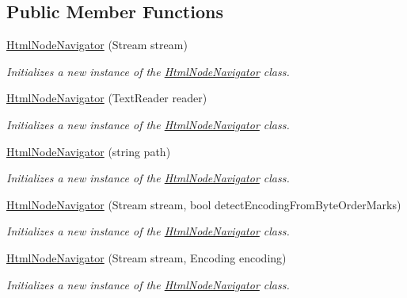 \subsection*{Public Member Functions}
\begin{DoxyCompactItemize}
\item 
\hyperlink{class_html_agility_pack_1_1_html_node_navigator_aecbd88a04f3d05a10f6a489098973ab6}{Html\+Node\+Navigator} (Stream stream)
\begin{DoxyCompactList}\small\item\em Initializes a new instance of the \hyperlink{class_html_agility_pack_1_1_html_node_navigator}{Html\+Node\+Navigator} class. \end{DoxyCompactList}\item 
\hyperlink{class_html_agility_pack_1_1_html_node_navigator_ac81f609b7631365884c346ee186457cd}{Html\+Node\+Navigator} (Text\+Reader reader)
\begin{DoxyCompactList}\small\item\em Initializes a new instance of the \hyperlink{class_html_agility_pack_1_1_html_node_navigator}{Html\+Node\+Navigator} class. \end{DoxyCompactList}\item 
\hyperlink{class_html_agility_pack_1_1_html_node_navigator_add1218ba51639a54431ede39675372cb}{Html\+Node\+Navigator} (string path)
\begin{DoxyCompactList}\small\item\em Initializes a new instance of the \hyperlink{class_html_agility_pack_1_1_html_node_navigator}{Html\+Node\+Navigator} class. \end{DoxyCompactList}\item 
\hyperlink{class_html_agility_pack_1_1_html_node_navigator_a7c91f826d5207f21a16645d029672127}{Html\+Node\+Navigator} (Stream stream, bool detect\+Encoding\+From\+Byte\+Order\+Marks)
\begin{DoxyCompactList}\small\item\em Initializes a new instance of the \hyperlink{class_html_agility_pack_1_1_html_node_navigator}{Html\+Node\+Navigator} class. \end{DoxyCompactList}\item 
\hyperlink{class_html_agility_pack_1_1_html_node_navigator_a1893182fcc1c74178ceae9ca90c46635}{Html\+Node\+Navigator} (Stream stream, Encoding encoding)
\begin{DoxyCompactList}\small\item\em Initializes a new instance of the \hyperlink{class_html_agility_pack_1_1_html_node_navigator}{Html\+Node\+Navigator} class. \end{DoxyCompactList}\item 

\end{DoxyCompactItemize}
